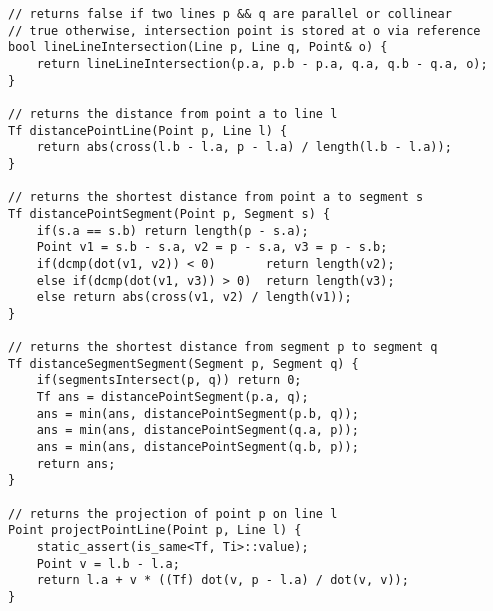 \documentclass[FSZ,a4paper,onesided]{article}
\begin{document}
\begin{multicols*}{\COLS}
\begin{lstlisting}
// returns false if two lines p && q are parallel or collinear
// true otherwise, intersection point is stored at o via reference
bool lineLineIntersection(Line p, Line q, Point& o) {
    return lineLineIntersection(p.a, p.b - p.a, q.a, q.b - q.a, o);
}

// returns the distance from point a to line l
Tf distancePointLine(Point p, Line l) {
    return abs(cross(l.b - l.a, p - l.a) / length(l.b - l.a));
}

// returns the shortest distance from point a to segment s
Tf distancePointSegment(Point p, Segment s) {
    if(s.a == s.b) return length(p - s.a);
    Point v1 = s.b - s.a, v2 = p - s.a, v3 = p - s.b;
    if(dcmp(dot(v1, v2)) < 0)       return length(v2);
    else if(dcmp(dot(v1, v3)) > 0)  return length(v3);
    else return abs(cross(v1, v2) / length(v1));
}

// returns the shortest distance from segment p to segment q
Tf distanceSegmentSegment(Segment p, Segment q) {
    if(segmentsIntersect(p, q)) return 0;
    Tf ans = distancePointSegment(p.a, q);
    ans = min(ans, distancePointSegment(p.b, q));
    ans = min(ans, distancePointSegment(q.a, p));
    ans = min(ans, distancePointSegment(q.b, p));
    return ans;
}

// returns the projection of point p on line l
Point projectPointLine(Point p, Line l) {
    static_assert(is_same<Tf, Ti>::value);
    Point v = l.b - l.a;
    return l.a + v * ((Tf) dot(v, p - l.a) / dot(v, v));
}\end{lstlisting}

\end{multicols*}
\end{document}
